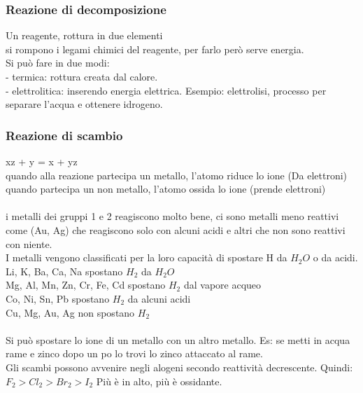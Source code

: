 \subsubsection{Reazione di decomposizione}
Un reagente, rottura in due elementi\\
si rompono i legami chimici del reagente, per farlo però serve energia.\\
Si può fare in due modi:\\
\tab- termica: rottura creata dal calore.\\
\tab- elettrolitica: inserendo energia elettrica. Esempio: elettrolisi, processo per separare l'acqua e ottenere idrogeno.
\subsubsection{Reazione di scambio}
xz + y = x + yz\\
quando alla reazione partecipa un metallo, l'atomo riduce lo ione (Da elettroni)\\
quando partecipa un non metallo, l'atomo ossida lo ione (prende elettroni)\\\\
i metalli dei gruppi 1 e 2 reagiscono molto bene, ci sono metalli meno reattivi come (Au, Ag) che reagiscono solo con alcuni acidi e altri che non sono reattivi con niente.\\
I metalli vengono classificati per la loro capacità di spostare H da $H_2O$ o da acidi.\\
Li, K, Ba, Ca, Na spostano $H_2$ da $H_2O$\\
Mg, Al, Mn, Zn, Cr, Fe, Cd spostano $H_2$ dal vapore acqueo\\
Co, Ni, Sn, Pb spostano $H_2$ da alcuni acidi\\
Cu, Mg, Au, Ag non spostano $H_2$\\\\
Si può spostare lo ione di un metallo con un altro metallo. Es: se metti in acqua rame e zinco dopo un po lo trovi lo zinco attaccato al rame.\\
Gli scambi possono avvenire negli alogeni secondo reattività decrescente. Quindi:\\
$F_2 > Cl_2 > Br_2 > I_2$ Più è in alto, più è ossidante.